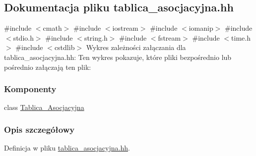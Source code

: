 \hypertarget{tablica__asocjacyjna_8hh}{\subsection{\-Dokumentacja pliku tablica\-\_\-asocjacyjna.\-hh}
\label{tablica__asocjacyjna_8hh}
}
{\ttfamily \#include $<$cmath$>$}\*
{\ttfamily \#include $<$iostream$>$}\*
{\ttfamily \#include $<$iomanip$>$}\*
{\ttfamily \#include $<$stdio.\-h$>$}\*
{\ttfamily \#include $<$string.\-h$>$}\*
{\ttfamily \#include $<$fstream$>$}\*
{\ttfamily \#include $<$time.\-h$>$}\*
{\ttfamily \#include $<$cstdlib$>$}\*
\-Wykres zależności załączania dla tablica\-\_\-asocjacyjna.\-hh\-:
\-Ten wykres pokazuje, które pliki bezpośrednio lub pośrednio załączają ten plik\-:
\subsubsection*{\-Komponenty}
\begin{DoxyCompactItemize}
\item 
class \hyperlink{class_tablica___asocjacyjna}{\-Tablica\-\_\-\-Asocjacyjna}
\end{DoxyCompactItemize}


\subsubsection{\-Opis szczegółowy}


\-Definicja w pliku \hyperlink{tablica__asocjacyjna_8hh_source}{tablica\-\_\-asocjacyjna.\-hh}.

